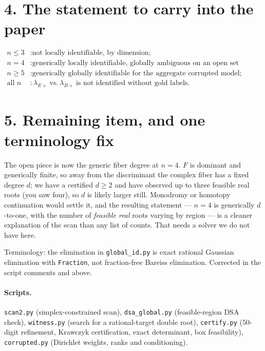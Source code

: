 \documentclass[11pt]{article}
\theoremstyle{remark}
\begin{document}
\section*{4. The statement to carry into the paper}

\[
\boxed{\begin{array}{ll}
n\le3 &: \text{not locally identifiable, by dimension;}\\[1mm]
n=4 &: \text{generically locally identifiable, globally ambiguous on an open set (certified);}\\[1mm]
n\ge5 &: \text{generically globally identifiable for the aggregate corrupted model;}\\[1mm]
\text{all }n &: \lambda_{E+}\ \text{vs.}\ \lambda_{B+}\ \text{is not identified without gold labels.}
\end{array}}
\]

\section*{5. Remaining item, and one terminology fix}

The open piece is now the generic fiber degree at $n=4$. $F$ is dominant and generically finite, so away from the discriminant the complex fiber has a fixed degree $d$; we have a certified $d\ge2$ and have observed up to three feasible real roots (you saw four), so $d$ is likely larger still. Monodromy or homotopy continuation would settle it, and the resulting statement --- $n=4$ is generically $d$-to-one, with the number of \emph{feasible real} roots varying by region --- is a cleaner explanation of the scan than any list of counts. That needs a solver we do not have here.

Terminology: the elimination in \texttt{global\_id.py} is exact rational Gaussian elimination with \texttt{Fraction}, not fraction-free Bareiss elimination. Corrected in the script comments and above.

\paragraph{Scripts.}\sloppy \texttt{scan2.py} (simplex-constrained scan), \texttt{dsa\_global.py} (feasible-region DSA check), \texttt{witness.py} (search for a rational-target double root), \texttt{certify.py} (50-digit refinement, Krawczyk certification, exact determinant, box feasibility), \texttt{corrupted.py} (Dirichlet weights, ranks and conditioning).
\end{document}
